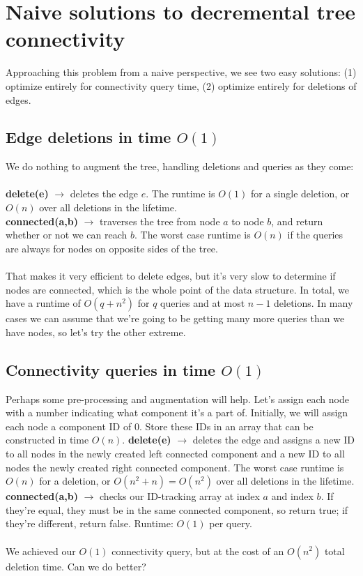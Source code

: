 \documentclass{article}
\begin{document}
\section{Naive solutions to decremental tree connectivity}
Approaching this problem from a naive perspective, we see two easy solutions: (1) optimize entirely for connectivity query time, (2) optimize entirely for deletions of edges.

\subsection{Edge deletions in time $O(1)$}
We do nothing to augment the tree, handling deletions and queries as they come: \\ \\
\textbf{delete(e)} $\rightarrow$ deletes the edge $e$. The runtime is $O(1)$ for a single deletion, or $O(n)$ over all deletions in the lifetime.  \\
\textbf{connected(a,b)} $\rightarrow$ traverses the tree from node $a$ to node $b$, and return whether or not we can reach $b$. The worst case runtime is $O(n)$ if the queries are always for nodes on opposite sides of the tree. \\ \\
That makes it very efficient to delete edges, but it's very slow to determine if nodes are connected, which is the whole point of the data structure. In total, we have a runtime of $O(q + n^2)$ for $q$ queries and at most $n-1$ deletions.  In many cases we can assume that we're going to be getting many more queries than we have nodes, so let's try the other extreme.

\subsection{Connectivity queries in time $O(1)$}
Perhaps some pre-processing and augmentation will help. Let's assign each node with a number indicating what component it's a part of.  Initially, we will assign each node a component ID of 0. Store these IDs in an array that can be constructed in time $O(n)$.
\textbf{delete(e)} $\rightarrow$ deletes the edge and assigns a new ID to all nodes in the newly created left connected component and a new ID to all nodes the newly created right connected component. The worst case runtime is $O(n)$ for a deletion, or $O(n^2 + n) = O(n^2)$ over all deletions in the lifetime.  \\
\textbf{connected(a,b)} $\rightarrow$ checks our ID-tracking array at index $a$ and index $b$. If they're equal, they must be in the same connected component, so return true; if they're different, return false. Runtime: $O(1)$ per query. \\ \\
We achieved our $O(1)$ connectivity query, but at the cost of an $O(n^2)$ total deletion time. Can we do better?
\end{document}
